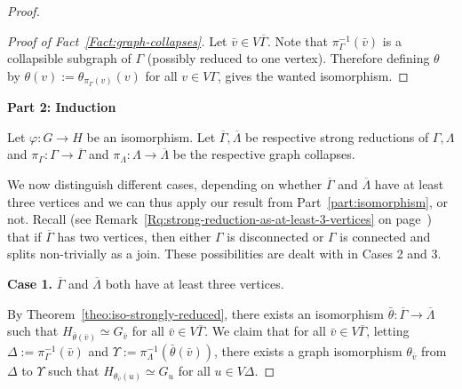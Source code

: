 \documentclass[a4paper,english,11pt]{article}
\theoremstyle{definition}
\theoremstyle{remark}
\begin{document}
\begin{proof}
\begin{proof}[Proof of Fact~\ref{Fact:graph-collapses}] Let $\bar{v}\in
  V\overline{\Gamma}$. Note that $\pi^{-1}_\Gamma(\bar{v})$ is a collapsible
  subgraph of $\Gamma$ (possibly reduced to one vertex).
  Therefore defining $\theta$ by $\theta(v):=\theta_{\pi_{\Gamma}(v)}(v)$ for all $v\in V\Gamma$, gives the wanted isomorphism.
\end{proof}

\newpage

\begin{center}
    \textbf{Part 2: Induction}    
\end{center}
Let $\varphi:G\to H$ be an isomorphism. Let $\overline{\Gamma},\overline{\Lambda}$ be respective strong reductions of $\Gamma,\Lambda$ and $\pi_\Gamma:\Gamma\to\overline{\Gamma}$ and $\pi_{\Lambda}:\Lambda\to\overline{\Lambda}$ be the respective graph collapses. 

We now distinguish different cases, depending on whether $\overline{\Gamma}$ and $\overline{\Lambda}$ have at least three vertices and we can thus apply our result from Part~\ref{part:isomorphism}, or not. Recall (see Remark~\ref{Rq:strong-reduction-as-at-least-3-vertices} on page~\pageref{Rq:strong-reduction-as-at-least-3-vertices}) that if $\overline{\Gamma}$ has two vertices, then either $\Gamma$ is disconnected or $\Gamma$ is connected and splits non-trivially as a join. These possibilities are dealt with in Cases 2 and 3. 
\medskip


\textbf{Case 1.} $\overline{\Gamma}$ and $\overline{\Lambda}$ both have at least three vertices. 
\smallskip

By Theorem~\ref{theo:iso-strongly-reduced}, there exists an isomorphism $\bar\theta:\overline{\Gamma}\to\overline{\Lambda}$ such that $H_{\bar\theta(\bar v)}\simeq G_{\bar v}$ for all $\bar{v}\in V\overline{\Gamma}$. We claim that for all $\bar{v}\in V\overline{\Gamma}$, letting $\Delta:=\pi^{-1}_\Gamma \left(\bar{v}\right)$ and $\Upsilon:=\pi^{-1}_\Lambda \left(\bar\theta(\bar{v})\right)$, there exists a graph isomorphism $\theta_{\bar{v}}$ from $\Delta$ to $\Upsilon$ such that $H_{\theta_{\bar{v}}(u)}\simeq G_u$ for all $u\in V\Delta$. 


\end{proof}
\end{document}
